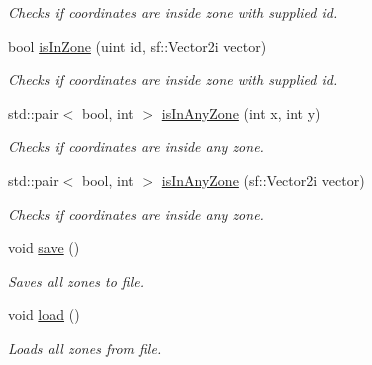 \begin{DoxyCompactItemize}
\begin{DoxyCompactList}\small\item\em Checks if coordinates are inside zone with supplied id. \end{DoxyCompactList}\item 
\hypertarget{classZoneManager_a2a44bd69cd6ebc921362280cd9b77fa3}{bool \hyperlink{classZoneManager_a2a44bd69cd6ebc921362280cd9b77fa3}{is\-In\-Zone} (uint id, sf\-::\-Vector2i vector)}\label{classZoneManager_a2a44bd69cd6ebc921362280cd9b77fa3}

\begin{DoxyCompactList}\small\item\em Checks if coordinates are inside zone with supplied id. \end{DoxyCompactList}\item 
\hypertarget{classZoneManager_a1627d595ec442fcb82d4ea770006327c}{std\-::pair$<$ bool, int $>$ \hyperlink{classZoneManager_a1627d595ec442fcb82d4ea770006327c}{is\-In\-Any\-Zone} (int x, int y)}\label{classZoneManager_a1627d595ec442fcb82d4ea770006327c}

\begin{DoxyCompactList}\small\item\em Checks if coordinates are inside any zone. \end{DoxyCompactList}\item 
\hypertarget{classZoneManager_af99f3a88afa59f3df6fb3a83adf54844}{std\-::pair$<$ bool, int $>$ \hyperlink{classZoneManager_af99f3a88afa59f3df6fb3a83adf54844}{is\-In\-Any\-Zone} (sf\-::\-Vector2i vector)}\label{classZoneManager_af99f3a88afa59f3df6fb3a83adf54844}

\begin{DoxyCompactList}\small\item\em Checks if coordinates are inside any zone. \end{DoxyCompactList}\item 
\hypertarget{classZoneManager_a03e6c9f49bf83b0b8ce663d49e5f398b}{void \hyperlink{classZoneManager_a03e6c9f49bf83b0b8ce663d49e5f398b}{save} ()}\label{classZoneManager_a03e6c9f49bf83b0b8ce663d49e5f398b}

\begin{DoxyCompactList}\small\item\em Saves all zones to file. \end{DoxyCompactList}\item 
\hypertarget{classZoneManager_aa9587473c290133ef47a835d362de011}{void \hyperlink{classZoneManager_aa9587473c290133ef47a835d362de011}{load} ()}\label{classZoneManager_aa9587473c290133ef47a835d362de011}

\begin{DoxyCompactList}\small\item\em Loads all zones from file. \end{DoxyCompactList}\end{DoxyCompactItemize}
